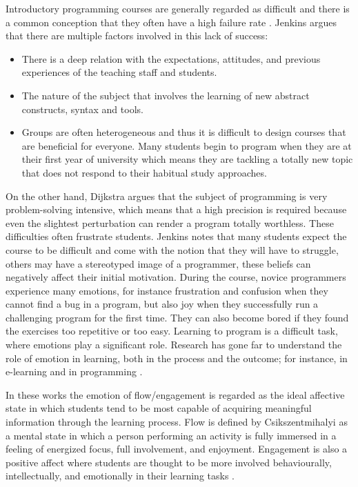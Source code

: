 \documentclass[conference]{IEEEtran}
\begin{document}
Introductory programming courses are
generally regarded as difficult \cite{robins2003learning,lahtinen2005study} 
and there is a common conception that they often have a high
failure rate \cite{bennedsen2007failure}. Jenkins \cite{jenkins2001motivation} argues that there 
are multiple factors involved in this lack of success: 
\begin{itemize}
\item There is a deep relation with the expectations, attitudes, 
and previous experiences of the teaching staff and students. 
\item The nature of the subject that involves the 
learning of new abstract constructs, syntax and tools.
\item Groups are often heterogeneous and thus it is difficult to design courses 
that are beneficial for everyone. Many students begin to program when they 
are at their first year of university which means they are tackling a totally
new topic that does not respond to their habitual study approaches. 
\end{itemize}
On the other hand, Dijkstra \cite{dijkstra1989cruelty} argues that the subject of programming is very
problem-solving intensive, which means that a  high precision is required because even the
slightest perturbation can render a program totally worthless. These
difficulties often frustrate students. 
Jenkins \cite{jenkins2001motivation,jenkins2002difficulty} notes that many
students expect the course to be difficult and come with the notion that they
will have to struggle, others may have a stereotyped image of a programmer,
these beliefs can negatively affect their initial motivation. During the course,
novice programmers experience many emotions, for instance frustration and
confusion when they cannot find a bug in a program, but also joy when they
successfully run a challenging program for the first time. They can also become
bored if they found the exercises too repetitive or too easy. Learning to
program is a difficult task, where emotions play a significant role. Research
has gone far to understand the role of emotion in learning, both in the process
and the outcome; for instance, in e-learning  \cite{kort2001affective,rossin2009effects}
and in programming  \cite{rodrigo2009affective,jenkins2001motivation,
bosch2013emotions,khan2007mood}.

In these works the emotion of flow/engagement is regarded as the ideal affective state in which
students tend to be most capable of acquiring meaningful information through the
learning process. Flow is defined by Csikszentmihalyi \cite{csikszentmihalyi1990flow}
as a mental state in which a person performing an activity is fully immersed in a feeling of
energized focus, full involvement, and enjoyment. Engagement is also a positive
affect where students are thought to be more involved behaviourally,
intellectually, and emotionally in their learning tasks \cite{bangert2002teacher}.
\end{document}
